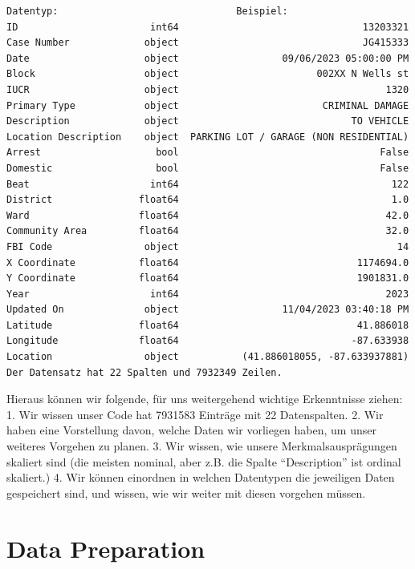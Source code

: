 \documentclass[10pt]{article}
\begin{document}
    \begin{Verbatim}[commandchars=\\\{\}]
                     Datentyp:                               Beispiel:
ID                       int64                                13203321
Case Number             object                                JG415333
Date                    object                  09/06/2023 05:00:00 PM
Block                   object                        002XX N Wells st
IUCR                    object                                    1320
Primary Type            object                         CRIMINAL DAMAGE
Description             object                              TO VEHICLE
Location Description    object  PARKING LOT / GARAGE (NON RESIDENTIAL)
Arrest                    bool                                   False
Domestic                  bool                                   False
Beat                     int64                                     122
District               float64                                     1.0
Ward                   float64                                    42.0
Community Area         float64                                    32.0
FBI Code                object                                      14
X Coordinate           float64                               1174694.0
Y Coordinate           float64                               1901831.0
Year                     int64                                    2023
Updated On              object                  11/04/2023 03:40:18 PM
Latitude               float64                               41.886018
Longitude              float64                              -87.633938
Location                object           (41.886018055, -87.633937881)
Der Datensatz hat 22 Spalten und 7932349 Zeilen.
    \end{Verbatim}

    Hieraus können wir folgende, für uns weitergehend wichtige Erkenntnisse
ziehen: 1. Wir wissen unser Code hat 7931583 Einträge mit 22
Datenspalten. 2. Wir haben eine Vorstellung davon, welche Daten wir
vorliegen haben, um unser weiteres Vorgehen zu planen. 3. Wir wissen,
wie unsere Merkmalsausprägungen skaliert sind (die meisten nominal, aber
z.B. die Spalte ``Description'' ist ordinal skaliert.) 4. Wir können
einordnen in welchen Datentypen die jeweiligen Daten gespeichert sind,
und wissen, wie wir weiter mit diesen vorgehen müssen.

    \section{Data Preparation}\label{data-preparation}
\end{document}
